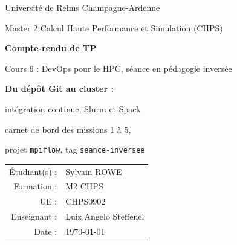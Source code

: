 \documentclass[11pt,a4paper]{article}
\newcommand{\etudiants}{Sylvain ROWE}
\begin{document}
\begin{titlepage}
\centering
\vspace*{0.4cm}
{\large Université de Reims Champagne-Ardenne\par}
\vspace{0.15cm}
{\large Master 2 Calcul Haute Performance et Simulation (CHPS)\par}
\vspace{4.2cm}
{\Large\bfseries Compte-rendu de TP\par}
\vspace{0.4cm}
{\large Cours 6 : DevOps pour le HPC, séance en pédagogie inversée\par}
\vspace{1.8cm}
{\LARGE\bfseries Du dépôt Git au cluster :\par\vspace{0.25cm}
intégration continue, Slurm et Spack\par}
\vspace{0.8cm}
{\large carnet de bord des missions 1 à 5,\par
projet \texttt{mpiflow}, tag \texttt{seance-inversee}\par}
\vfill
{\large
\begin{tabular}{r@{\quad}l}
Étudiant(s) : & \etudiants\\
Formation : & M2 CHPS\\
UE : & CHPS0902\\
Enseignant : & Luiz Angelo Steffenel\\
Date : & \today\\
\end{tabular}\par}
\vspace{2.2cm}
\end{titlepage}

\ifbrouillon
\thispagestyle{empty}
\end{document}
